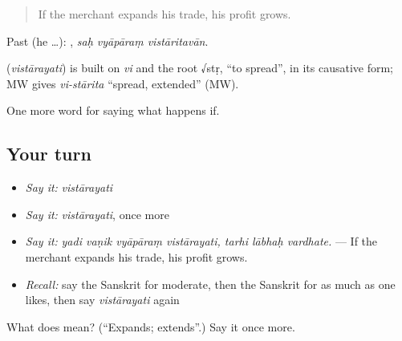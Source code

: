 \begin{quote}
If the merchant expands his trade, his profit grows.
\end{quote}

Past (he …):   , \emph{saḥ vyāpāraṃ vistāritavān}.

\begin{cousinweb}
\textbf{} (\emph{vistārayati}) is built on \emph{vi} and the root √stṛ, \textquotedblleft{}to spread\textquotedblright{}, in its causative form; MW gives \emph{vi-stārita} \textquotedblleft{}spread, extended\textquotedblright{} (MW).
\end{cousinweb}

\begin{grammarlens}[title={What you've built}]
One more word for saying what happens if.
\end{grammarlens}

\subsection*{Your turn}
\begin{itemize}
\raggedright
  \item \emph{Say it:} \emph{vistārayati}
  \item \emph{Say it:} \emph{vistārayati}, once more
  \item \emph{Say it:} \emph{yadi vaṇik vyāpāraṃ vistārayati, tarhi lābhaḥ vardhate.} — If the merchant expands his trade, his profit grows.
  \item \emph{Recall:} say the Sanskrit for moderate, then the Sanskrit for as much as one likes, then say \emph{vistārayati} again
\end{itemize}

\begin{tcolorbox}[breakable,colback=teal!4,colframe=teal!35!black,title={Before you move on}]
What does  mean? (\textquotedblleft{}Expands; extends\textquotedblright{}.) Say it once more.
\end{tcolorbox}
